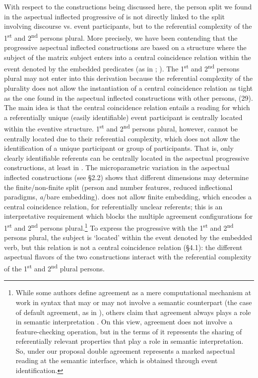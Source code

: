 \documentclass[output=paper]{langsci/langscibook}
\begin{document}
With respect to the constructions being discussed here, the person split we found in the aspectual inflected progressive of  is not directly linked to the split involving discourse vs. event participants, but to the referential complexity of the 1\textsuperscript{st} and 2\textsuperscript{nd} persons plural. More precisely, we have been contending that the progressive aspectual inflected constructions are based on a  structure where the subject of the matrix subject enters into a central coincidence relation within the event denoted by the embedded predicates (as in \citealt{Mateu1999}; \citealt{Laka2006}). The 1\textsuperscript{st} and 2\textsuperscript{nd} persons plural may not enter into this derivation because the referential complexity of the plurality does not allow the instantiation of a central coincidence relation as tight as the one found in the aspectual inflected constructions with other persons, (29). The main idea is that the central coincidence relation entails a reading for which a referentially unique (easily identifiable) event participant is centrally located within the eventive structure. 1\textsuperscript{st} and 2\textsuperscript{nd} persons plural, however, cannot be centrally located due to their referential complexity, which does not allow the identification of a unique participant or group of participants. That is, only clearly identifiable referents can be centrally located in the aspectual progressive constructions, at least in . The microparametric variation in the aspectual inflected constructions (see §2.2) shows that different dimensions may determine the finite\slash non-finite split (person and number features, reduced inflectional paradigms, \textit{a}/bare embedding).  does not allow finite embedding, which encodes a central coincidence relation, for referentially unclear referents; this is an interpretative requirement which blocks the multiple agreement configurations for 1\textsuperscript{st} and 2\textsuperscript{nd} persons plural.\footnote{While some authors define agreement as a mere computational mechanism at work in syntax that may or may not involve a semantic counterpart (the case of default agreement, as in \citealt{Preminger2014}), others claim that agreement always plays a role in semantic interpretation \citep{Manzini2007,Manzini2011Bio}. On this view, agreement does not involve a feature{}-checking operation, but in the terms of \citet{Manzini2007} it represents the sharing of referentially relevant properties that play a role in semantic interpretation. So, under our proposal double agreement represents a marked aspectual reading at the semantic interface, which is obtained through event identification.} To express the progressive with the 1\textsuperscript{st} and 2\textsuperscript{nd} persons plural, the subject is ‘located’ within the event denoted by the embedded verb, but this  relation is not a central coincidence relation (§4.1): the different aspectual flavors of the two constructions interact with the referential complexity of the 1\textsuperscript{st} and 2\textsuperscript{nd} plural persons.
\end{document}
